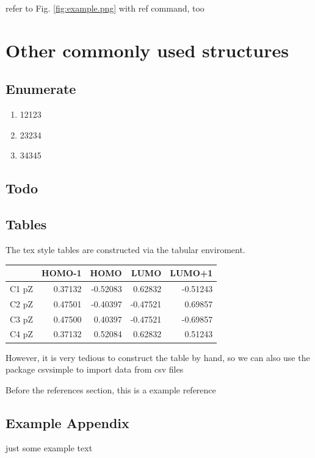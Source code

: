 \documentclass{article}
\begin{document}
refer to Fig. \ref{fig:example.png} with ref command, too

\section{Other commonly used structures}

\subsection{Enumerate}

\begin{enumerate}
	\item 12123
	\item 23234
	\item 34345
\end{enumerate}

\subsection{Todo}


\subsection{Tables}

The tex style tables are constructed via the tabular enviroment. 

\begin{tabular}{l r r r r} \label{table:s-trans-1,3-butadiene}
	      & HOMO-1  & HOMO     & LUMO     & LUMO+1   \\
	\hline
	C1 pZ & 0.37132 & -0.52083 & 0.62832  & -0.51243 \\
	C2 pZ & 0.47501 & -0.40397 & -0.47521 & 0.69857  \\
	C3 pZ & 0.47500 & 0.40397  & -0.47521 & -0.69857 \\
	C4 pZ & 0.37132 & 0.52084  & 0.62832  & 0.51243  \\
\end{tabular}

However, it is very tedious to construct the table by hand, so we can also use the package csvsimple to import data from csv files


Before the references section, this is a example reference\cite{craig2004quantum}






\newpage

\begin{appendices}

	\section{Example Appendix}

	just some example text

\end{appendices}
\end{document}
